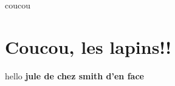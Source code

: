 \documentclass{report}[11pt,a4paper]
\begin{document}
\begin{titlepage}
coucou
\end{titlepage}
\section{Coucou, les lapins!!}
hello
\textbf{jule de chez smith d'en face}
\end{document}
